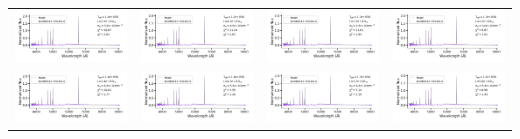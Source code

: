 \begin{table}
\begin{tabular}{l l l l }
    \includegraphics[width=0.24\linewidth, clip]{Figs/model_140000_36.98_3.54.pdf} & \includegraphics[width=0.24\linewidth, clip]{Figs/model_120000_37.22_3.65.pdf} & \includegraphics[width=0.24\linewidth, clip]{Figs/model_130000_36.86_3.40.pdf} & \includegraphics[width=0.24\linewidth, clip]{Figs/model_130000_36.93_3.48.pdf} \\
    \includegraphics[width=0.24\linewidth, clip]{Figs/model_140000_37.12_3.65.pdf} & \includegraphics[width=0.24\linewidth, clip]{Figs/model_140000_37.22_3.74.pdf} & \includegraphics[width=0.24\linewidth, clip]{Figs/model_130000_37.15_3.65.pdf} & \includegraphics[width=0.24\linewidth, clip]{Figs/model_120000_37.35_3.74.pdf} \\

\end{tabular}
\end{table}
